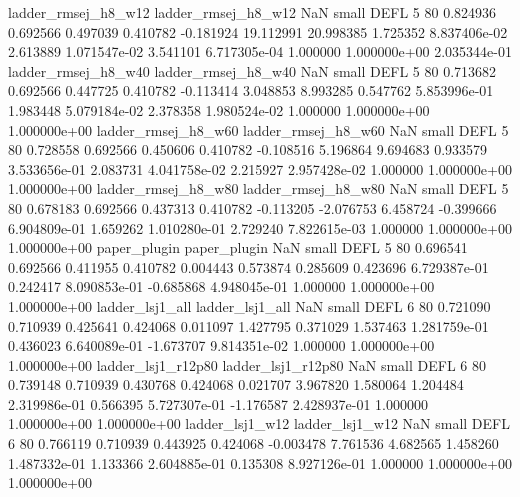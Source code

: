      ladder_rmsej_h8_w12      ladder_rmsej_h8_w12                   NaN      small     DEFL                 5 80 0.824936       0.692566 0.497039       0.410782   -0.181924     19.112991     20.998385     1.725352   8.837406e-02  2.613889 1.071547e-02     3.541101   6.717305e-04            1.000000    1.000000e+00        2.035344e-01
     ladder_rmsej_h8_w40      ladder_rmsej_h8_w40                   NaN      small     DEFL                 5 80 0.713682       0.692566 0.447725       0.410782   -0.113414      3.048853      8.993285     0.547762   5.853996e-01  1.983448 5.079184e-02     2.378358   1.980524e-02            1.000000    1.000000e+00        1.000000e+00
     ladder_rmsej_h8_w60      ladder_rmsej_h8_w60                   NaN      small     DEFL                 5 80 0.728558       0.692566 0.450606       0.410782   -0.108516      5.196864      9.694683     0.933579   3.533656e-01  2.083731 4.041758e-02     2.215927   2.957428e-02            1.000000    1.000000e+00        1.000000e+00
     ladder_rmsej_h8_w80      ladder_rmsej_h8_w80                   NaN      small     DEFL                 5 80 0.678183       0.692566 0.437313       0.410782   -0.113205     -2.076753      6.458724    -0.399666   6.904809e-01  1.659262 1.010280e-01     2.729240   7.822615e-03            1.000000    1.000000e+00        1.000000e+00
            paper_plugin             paper_plugin                   NaN      small     DEFL                 5 80 0.696541       0.692566 0.411955       0.410782    0.004443      0.573874      0.285609     0.423696   6.729387e-01  0.242417 8.090853e-01    -0.685868   4.948045e-01            1.000000    1.000000e+00        1.000000e+00
         ladder_lsj1_all          ladder_lsj1_all                   NaN      small     DEFL                 6 80 0.721090       0.710939 0.425641       0.424068    0.011097      1.427795      0.371029     1.537463   1.281759e-01  0.436023 6.640089e-01    -1.673707   9.814351e-02            1.000000    1.000000e+00        1.000000e+00
      ladder_lsj1_r12p80       ladder_lsj1_r12p80                   NaN      small     DEFL                 6 80 0.739148       0.710939 0.430768       0.424068    0.021707      3.967820      1.580064     1.204484   2.319986e-01  0.566395 5.727307e-01    -1.176587   2.428937e-01            1.000000    1.000000e+00        1.000000e+00
         ladder_lsj1_w12          ladder_lsj1_w12                   NaN      small     DEFL                 6 80 0.766119       0.710939 0.443925       0.424068   -0.003478      7.761536      4.682565     1.458260   1.487332e-01  1.133366 2.604885e-01     0.135308   8.927126e-01            1.000000    1.000000e+00        1.000000e+00
